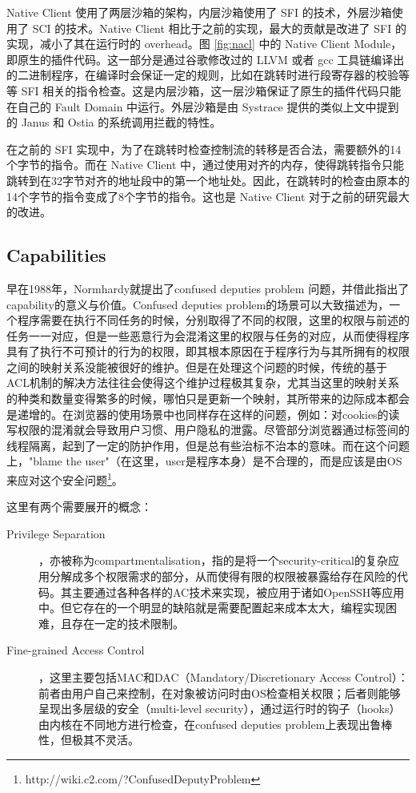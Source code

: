 \documentclass[final,5p,times]{elsarticle}
\begin{document}
Native Client 使用了两层沙箱的架构，内层沙箱使用了 SFI 的技术，外层沙箱使用了 SCI 的技术。Native Client 相比于之前的实现，最大的贡献是改进了 SFI 的实现，减小了其在运行时的 overhead。图 \ref{fig:nacl} 中的 Native Client Module，即原生的插件代码。这一部分是通过谷歌修改过的 LLVM 或者 gcc 工具链编译出的二进制程序，在编译时会保证一定的规则，比如在跳转时进行段寄存器的校验等等 SFI 相关的指令检查。这是内层沙箱，这一层沙箱保证了原生的插件代码只能在自己的 Fault Domain 中运行。外层沙箱是由 Systrace \cite{provos2003improving} 提供的类似上文中提到的 Janus 和 Ostia 的系统调用拦截的特性。

在之前的 SFI 实现中，为了在跳转时检查控制流的转移是否合法，需要额外的14个字节的指令。而在 Native Client 中，通过使用对齐的内存，使得跳转指令只能跳转到在32字节对齐的地址段中的第一个地址处。因此，在跳转时的检查由原本的14个字节的指令变成了8个字节的指令。这也是 Native Client 对于之前的研究最大的改进。

\subsection{Capabilities}
\label{ss:capabilities}

早在1988年，Normhardy就提出了confused deputies problem \cite{deputies} 问题，并借此指出了capability的意义与价值。Confused deputies problem的场景可以大致描述为，一个程序需要在执行不同任务的时候，分别取得了不同的权限，这里的权限与前述的任务一一对应，但是一些恶意行为会混淆这里的权限与任务的对应，从而使得程序具有了执行不可预计的行为的权限，即其根本原因在于程序行为与其所拥有的权限之间的映射关系没能被很好的维护。但是在处理这个问题的时候，传统的基于ACL机制的解决方法往往会使得这个维护过程极其复杂，尤其当这里的映射关系的种类和数量变得繁多的时候，哪怕只是更新一个映射，其所带来的边际成本都会是递增的。在浏览器的使用场景中也同样存在这样的问题，例如：对cookies的读写权限的混淆就会导致用户习惯、用户隐私的泄露。尽管部分浏览器通过标签间的线程隔离，起到了一定的防护作用\cite{capsicum}，但是总有些治标不治本的意味。而在这个问题上，"blame the user"（在这里，user是程序本身）是不合理的，而是应该是由OS来应对这个安全问题\footnote{http://wiki.c2.com/?ConfusedDeputyProblem}。

这里有两个需要展开的概念：
\begin{description}
\item[Privilege Separation]，亦被称为compartmentalisation，指的是将一个security-critical的复杂应用分解成多个权限需求的部分，从而使得有限的权限被暴露给存在风险的代码。其主要通过各种各样的AC技术来实现，被应用于诸如OpenSSH等应用中。但它存在的一个明显的缺陷就是需要配置起来成本太大，编程实现困难，且存在一定的技术限制。

\item[Fine-grained Access Control]，这里主要包括MAC和DAC（Mandatory/Discretionary Access Control）：前者由用户自己来控制，在对象被访问时由OS检查相关权限；后者则能够呈现出多层级的安全（multi-level security），通过运行时的钩子（hooks）由内核在不同地方进行检查，在confused deputies problem上表现出鲁棒性，但极其不灵活。
\end{description}
\end{document}
